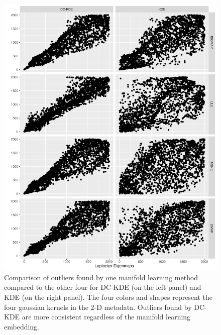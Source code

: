 \documentclass[11pt,a4paper,]{article}
\begin{document}
\begin{figure}

{\centering \includegraphics[width=0.95\linewidth]{figures/Twin Peak2000_density_compare_levs4ml_radius8_r0_5_rank} 

}

\caption{Comparison of outliers found by one manifold learning method compared to the other four for DC-KDE (on the left panel) and KDE (on the right panel). The four colors and shapes represent the four gaussian kernels in the 2-D metadata. Outliers found by DC-KDE are more consistent regardless of the manifold learning embedding.}\label{fig:tpllevs4ml-2}
\end{figure}
\end{document}
